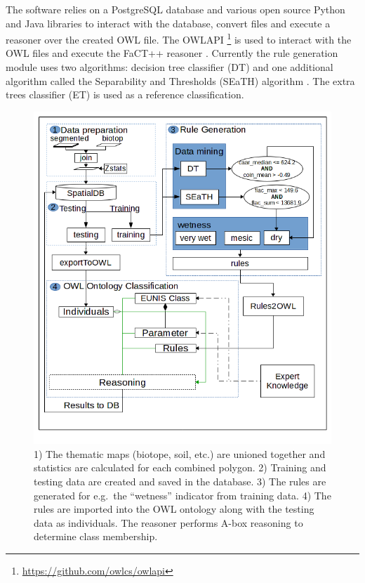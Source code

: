\documentclass[authoryear, review,12pt,number]{elsarticle}
\begin{document}
The software relies on a PostgreSQL database and various open source Python and
Java libraries to interact with the database, convert files and execute a
reasoner over the created OWL file. The OWLAPI
\footnote{\url{https://github.com/owlcs/owlapi}} is used to interact with the
OWL files and execute the FaCT++ reasoner \citep{Tsarkov2006}. Currently the
rule generation module uses two algorithms: decision tree classifier (DT) and
one additional algorithm called the Separability and Thresholds (SEaTH)
algorithm \citep{Nussbaum2006}. The extra trees classifier (ET) is used as a
reference classification.

\begin{figure}
\includegraphics[width=1\linewidth]{diagrams/final_workflow_diagram.png}
\caption
    {
        1) The thematic maps (biotope, soil, etc.) are unioned together and
        statistics are calculated for each combined polygon.
        2) Training and testing data are created and saved in the database.
        3) The rules are generated for e.g.\ the ``wetness'' indicator from
        training data.
        4) The rules are imported into the OWL ontology along with the testing
        data as individuals. The reasoner performs A-box reasoning to determine
        class membership.
    } 
\label{fig:full_workflow}
\end{figure}
\end{document}
